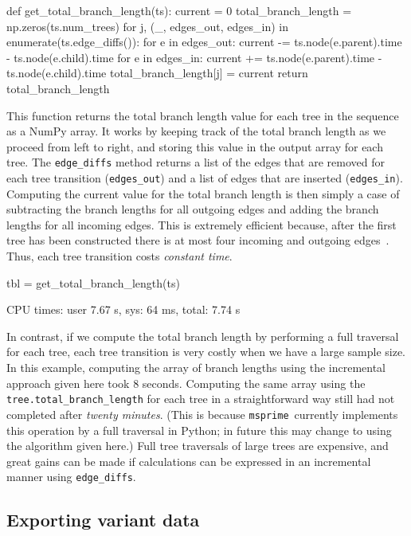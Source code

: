 \documentclass[graybox]{svmult}
\newcommand{\msprime}[0]{\texttt{msprime}}
\begin{document}
\begin{pythoncode}
def get_total_branch_length(ts):
    current = 0
    total_branch_length = np.zeros(ts.num_trees)
    for j, (_, edges_out, edges_in) in enumerate(ts.edge_diffs()):
        for e in edges_out:
            current -= ts.node(e.parent).time - ts.node(e.child).time
        for e in edges_in:
            current += ts.node(e.parent).time - ts.node(e.child).time
        total_branch_length[j] = current
    return total_branch_length
\end{pythoncode}

    This function returns the total branch length value for each tree in the
sequence as a NumPy array. It works by keeping track of the total branch
length as we proceed from left to right, and storing this value in the
output array for each tree. The \texttt{edge\_diffs} method returns a
list of the edges that are removed for each tree transition
(\texttt{edges\_out}) and a list of edges that are inserted
(\texttt{edges\_in}). Computing the current value for the total branch
length is then simply a case of subtracting the branch lengths for all
outgoing edges and adding the branch lengths for all incoming edges.
This is extremely efficient because, after the first tree has been
constructed there is at most four incoming and outgoing edges~\citep{kelleher2016efficient}. Thus,
each tree transition costs \emph{constant time}.

\begin{pythoncode}
tbl = get_total_branch_length(ts)

CPU times: user 7.67 s, sys: 64 ms, total: 7.74 s
\end{pythoncode}

In contrast, if we compute the total branch length by performing a
full traversal for each tree, each tree transition is very costly
when we have a large sample size. In this example, computing the array of branch lengths
using the incremental approach given here took 8 seconds. Computing the
same array using the \texttt{tree.total\_branch\_length} for each tree
in a straightforward way still had not completed after \emph{twenty
minutes}. (This is because \msprime\ currently implements this operation
by a full traversal in Python; in future this may change to using the
algorithm given here.) Full tree traversals of large trees are
expensive, and great gains can be made if calculations can be expressed
in an incremental manner using \texttt{edge\_diffs}.


\subsection{Exporting variant data}\label{exporting-variant-data}
\end{document}
